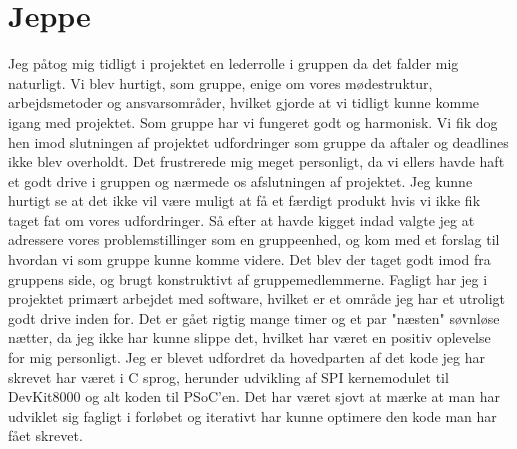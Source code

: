 \section{Jeppe}

Jeg påtog mig tidligt i projektet en lederrolle i gruppen da det falder mig naturligt. Vi blev hurtigt, som gruppe, enige om vores mødestruktur, arbejdsmetoder og ansvarsområder, hvilket gjorde at vi tidligt kunne komme igang med projektet. Som gruppe har vi fungeret godt og harmonisk. Vi fik dog hen imod slutningen af projektet udfordringer som gruppe da aftaler og deadlines ikke blev overholdt. Det frustrerede mig meget personligt, da vi ellers havde haft et godt drive i gruppen og nærmede os afslutningen af projektet. Jeg kunne hurtigt se at det ikke vil være muligt at få et færdigt produkt hvis vi ikke fik taget fat om vores udfordringer. Så efter at havde kigget indad valgte jeg at adressere vores problemstillinger som en gruppeenhed, og kom med et forslag til hvordan vi som gruppe kunne komme videre. Det blev der taget godt imod fra gruppens side, og brugt konstruktivt af gruppemedlemmerne.
Fagligt har jeg i projektet primært arbejdet med software, hvilket er et område jeg har et utroligt godt drive inden for. Det er gået rigtig mange timer og et par "næsten" søvnløse nætter, da jeg ikke har kunne slippe det, hvilket har været en positiv oplevelse for mig personligt. Jeg er blevet udfordret da hovedparten af det kode jeg har skrevet har været i C sprog, herunder udvikling af SPI kernemodulet til DevKit8000 og alt koden til PSoC'en. Det har været sjovt at mærke at man har udviklet sig fagligt i forløbet og iterativt har kunne optimere den kode man har fået skrevet.